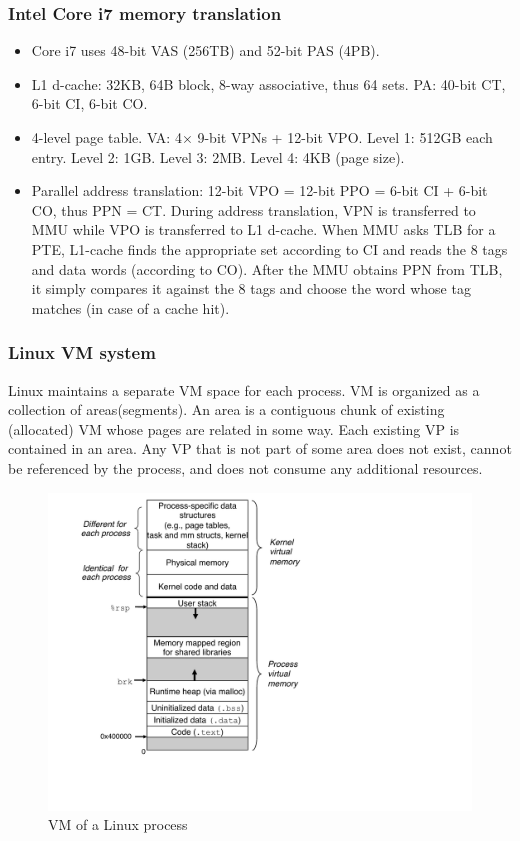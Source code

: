 \subsubsection{Intel Core i7 memory translation}
\begin{itemize}
\item Core i7 uses 48-bit VAS (256TB) and 52-bit PAS (4PB). 
\item L1 d-cache: 32KB, 64B block, 8-way associative, thus 64 sets. PA: 40-bit CT, 6-bit CI, 6-bit CO.
\item 4-level page table. VA: 4$\times$ 9-bit VPNs + 12-bit VPO. Level 1: 512GB each entry. Level 2: 1GB. Level 3: 2MB. Level 4: 4KB (page size).
\item Parallel address translation: 12-bit VPO = 12-bit PPO = 6-bit CI + 6-bit CO, thus PPN = CT. During address translation, VPN is transferred to MMU while VPO is transferred to L1 d-cache. When MMU asks TLB for a PTE, L1-cache finds the appropriate set according to CI and reads the 8 tags and data words (according to CO). After the MMU obtains PPN from TLB, it simply compares it against the 8 tags and choose the word whose tag matches (in case of a cache hit).
\end{itemize}
\subsubsection{Linux VM system}
Linux maintains a separate VM space for each process. VM is organized as a collection of areas(segments). An area is a contiguous chunk of existing (allocated) VM whose pages are related in some way. Each existing VP is contained in an area. Any VP that is not part of some area does not exist, cannot be referenced by the process, and does not consume any additional resources.
\begin{figure}
\centering
\includegraphics[width=\textwidth]{processimage.pdf}
\caption{VM of a Linux process}
\end{figure}

